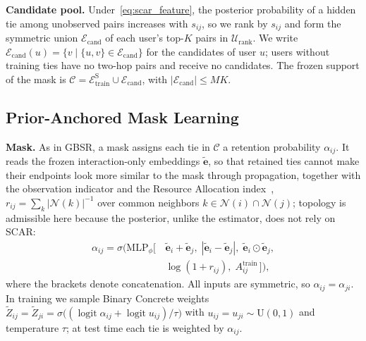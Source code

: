 \documentclass[sigconf]{acmart}
\begin{document}
\textbf{Candidate pool.} Under~\eqref{eq:scar_feature}, the posterior probability of a hidden tie among unobserved pairs increases with $s_{ij}$, so we rank by $s_{ij}$ and form the symmetric union $\mathcal{E}_{\text{cand}}$ of each user's top-$K$ pairs in $\mathcal{U}_{\text{rank}}$. We write $\mathcal{E}_{\text{cand}}(u) = \{v \mid \{u,v\} \in \mathcal{E}_{\text{cand}}\}$ for the candidates of user $u$; users without training ties have no two-hop pairs and receive no candidates. The frozen support of the mask is $\mathcal{C} = \mathcal{E}_{\text{train}}^{\text{S}} \cup \mathcal{E}_{\text{cand}}$, with $|\mathcal{E}_{\text{cand}}| \le MK$.

\subsection{Prior-Anchored Mask Learning}
\label{sec:vbi}
\textbf{Mask.} As in GBSR, a mask assigns each tie in $\mathcal{C}$ a retention probability $\alpha_{ij}$. It reads the frozen interaction-only embeddings $\tilde{\mathbf{e}}$, so that retained ties cannot make their endpoints look more similar to the mask through propagation, together with the observation indicator and the Resource Allocation index~\cite{zhou2009predicting}, $r_{ij} = \sum_{k} |\mathcal{N}(k)|^{-1}$ over common neighbors $k \in \mathcal{N}(i) \cap \mathcal{N}(j)$; topology is admissible here because the posterior, unlike the estimator, does not rely on SCAR:
\begin{equation}
\begin{split}
    \alpha_{ij} = \sigma\big(\text{MLP}_\phi[\, & \tilde{\mathbf{e}}_i + \tilde{\mathbf{e}}_j,\; |\tilde{\mathbf{e}}_i - \tilde{\mathbf{e}}_j|,\; \tilde{\mathbf{e}}_i \odot \tilde{\mathbf{e}}_j, \\
    & \log(1+r_{ij}),\; A_{ij}^{\text{train}}\,]\big),
\end{split} \label{eq:sym_mlp}
\end{equation}
where the brackets denote concatenation. All inputs are symmetric, so $\alpha_{ij} = \alpha_{ji}$. In training we sample Binary Concrete weights~\cite{maddison2017concrete, jang2017categorical} $\tilde{Z}_{ij} = \tilde{Z}_{ji} = \sigma\big((\operatorname{logit}\alpha_{ij} + \operatorname{logit} u_{ij})/\tau\big)$ with $u_{ij} = u_{ji} \sim \text{U}(0,1)$ and temperature $\tau$; at test time each tie is weighted by $\alpha_{ij}$.
\end{document}
